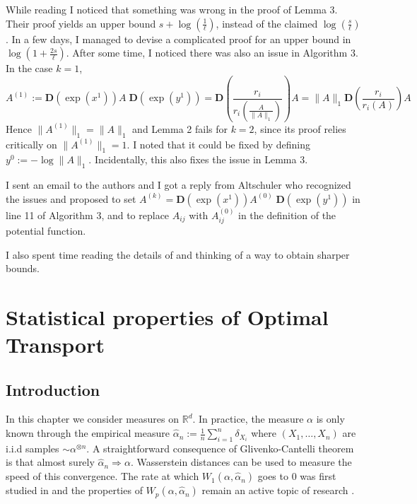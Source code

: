 \documentclass[12pt]{report}
\theoremstyle{definition}
\theoremstyle{remark}
\begin{document}
While reading \cite{altschuler2017near} I noticed that something was wrong in the proof of Lemma 3. Their proof yields an upper bound $s+\log\left(\frac 1\ell\right)$, instead of the claimed $\log\left(\frac s\ell\right)$. In a few days, I managed to devise a complicated proof for an upper bound in $\log\left(1+\frac {2s}{\ell}\right)$. After some time, I noticed there was also an issue in Algorithm 3.  In the case $k=1$, $$A^{(1)}:=\mathbf{D}\left(\exp \left(x^{1}\right)\right) A \; \mathbf{D}\left(\exp \left(y^{1}\right)\right) = \mathbf{D} \left(\frac{r_i}{r_i(\frac{A}{\|A\|_1})}\right)A = \|A\|_1 \mathbf{D} \left(\frac{r_i}{r_i(A)}\right)A$$ 
Hence $\|A^{(1)}\|_1 = \|A\|_1$ and Lemma 2 fails for $k=2$, since its proof relies critically on $\|A^{(1)}\|_1=1$. I noted that it could be fixed by defining $y^{0}:=-\log \|A\|_1$. Incidentally, this also fixes the issue in Lemma 3. 
\par I sent an email to the authors and I got a reply from Altschuler who recognized the issues and proposed to set $A^{(k)}=\mathbf{D}\left(\exp \left(x^{1}\right)\right) A^{(0)} \; \mathbf{D}\left(\exp \left(y^{1}\right)\right)$ in line 11 of Algorithm 3, and to replace $A_{ij}$ with $A_{ij}^{(0)}$ in the definition of the potential function.
\par I also spent time reading the details of \cite{dvurechensky2018computational} and thinking of a way to obtain sharper bounds. 




\newpage
\chapter{Statistical properties of Optimal Transport}

\section{Introduction}
\hspace{\parindent} In this chapter we consider measures on $\mathbb R^d$. In practice, the measure $\alpha$ is only known through the empirical measure $\hat \alpha_n:= \frac 1n \sum_{i=1}^n \delta_{X_i}$ where $(X_1,\ldots,X_n)$ are i.i.d samples $\sim \alpha^{\otimes n}$. A straightforward consequence of Glivenko-Cantelli theorem is that almost surely $\hat \alpha_n \Rightarrow \alpha$. Wasserstein distances can be used to measure the speed of this convergence. The rate at which $W_1(\alpha, \hat \alpha_n)$ goes to $0$ was first studied in \cite{dudley1969speed} and the properties of $W_p(\alpha, \hat \alpha_n)$ remain an active topic of research \cite{weed2019sharp}.
\end{document}
